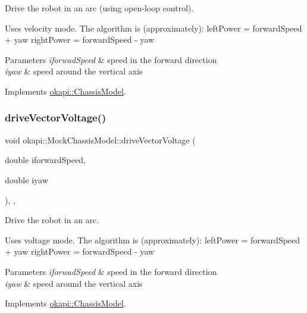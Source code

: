 Drive the robot in an arc (using open-\/loop control). 

Uses velocity mode. The algorithm is (approximately)\+: left\+Power = forward\+Speed + yaw right\+Power = forward\+Speed -\/ yaw


\begin{DoxyParams}{Parameters}
{\em iforwad\+Speed} & speed in the forward direction \\
\hline
{\em iyaw} & speed around the vertical axis \\
\hline
\end{DoxyParams}


Implements \mbox{\hyperlink{classokapi_1_1ChassisModel_aa621ce62c2bc336e41b859e2cb10dda5}{okapi\+::\+Chassis\+Model}}.

\mbox{\label{classokapi_1_1MockChassisModel_a8b788327fc3d4eab2be323e9b1ddf854}} 
\subsubsection{\texorpdfstring{driveVectorVoltage()}{driveVectorVoltage()}}
{\footnotesize\ttfamily void okapi\+::\+Mock\+Chassis\+Model\+::drive\+Vector\+Voltage (\begin{DoxyParamCaption}\item[{double}]{iforward\+Speed,  }\item[{double}]{iyaw }\end{DoxyParamCaption})\hspace{0.3cm}{\ttfamily [inline]}, {\ttfamily [override]}, {\ttfamily [virtual]}}



Drive the robot in an arc. 

Uses voltage mode. The algorithm is (approximately)\+: left\+Power = forward\+Speed + yaw right\+Power = forward\+Speed -\/ yaw


\begin{DoxyParams}{Parameters}
{\em iforwad\+Speed} & speed in the forward direction \\
\hline
{\em iyaw} & speed around the vertical axis \\
\hline
\end{DoxyParams}


Implements \mbox{\hyperlink{classokapi_1_1ChassisModel_a69115758be9e29888dce34f317d57150}{okapi\+::\+Chassis\+Model}}.

